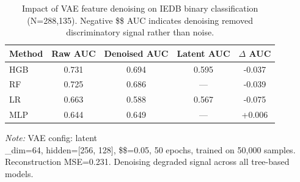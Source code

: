 \begin{table}[htbp]
\centering
\caption{Impact of VAE feature denoising on IEDB binary classification (N=288,135). Negative \$\Delta\$ AUC indicates denoising removed discriminatory signal rather than noise.}
\label{tab:vae_denoise}
\begin{tabular}{lcccc}
\toprule
Method & Raw AUC & Denoised AUC & Latent AUC & $\Delta$ AUC \\
\midrule
HGB & 0.731 & 0.694 & 0.595 & -0.037 \\
RF & 0.725 & 0.686 & --- & -0.039 \\
LR & 0.663 & 0.588 & 0.567 & -0.075 \\
MLP & 0.644 & 0.649 & --- & +0.006 \\
\bottomrule
\end{tabular}
\footnotesize {\textit{Note:} VAE config: latent\\_dim=64, hidden=[256, 128], \$\beta\$=0.05, 50 epochs, trained on 50,000 samples. Reconstruction MSE=0.231. Denoising degraded signal across all tree-based models.}
\end{table}
